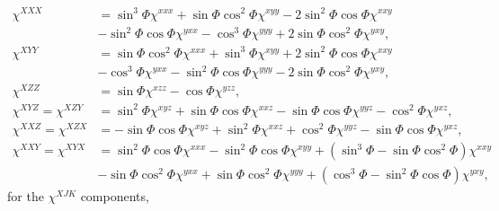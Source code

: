 \documentclass[aps,prb,10pt,letterpaper,notitlepage]{revtex4-1}
\begin{document}
\begin{equation}\label{eq:xcomps}
\begin{split}
\chi^{XXX} 
&=  \sin^{3}\Phi          \chi^{xxx}
 +  \sin\Phi \cos^{2}\Phi \chi^{xyy}
 - 2\sin^{2}\Phi \cos\Phi \chi^{xxy}\\
&-  \sin^{2}\Phi \cos\Phi \chi^{yxx}
 -  \cos^{3}\Phi          \chi^{yyy}
 + 2\sin\Phi \cos^{2}\Phi \chi^{yxy},\\[10pt]
\chi^{XYY} 
&=  \sin\Phi \cos^{2}\Phi \chi^{xxx}
 +  \sin^{3}\Phi          \chi^{xyy}
 + 2\sin^{2}\Phi \cos\Phi \chi^{xxy}\\
&-  \cos^{3}\Phi          \chi^{yxx}
 -  \sin^{2}\Phi \cos\Phi \chi^{yyy}
 - 2\sin\Phi \cos^{2}\Phi \chi^{yxy},\\[10pt]
\chi^{XZZ} 
&= \sin\Phi \chi^{xzz}
 - \cos\Phi \chi^{yzz},\\[10pt]
\chi^{XYZ} = \chi^{XZY}
&=
   \sin^{2}\Phi      \chi^{xyz}
 + \sin\Phi \cos\Phi \chi^{xxz}
 - \sin\Phi \cos\Phi \chi^{yyz}
 - \cos^{2}\Phi      \chi^{yxz},\\[10pt]
\chi^{XXZ} = \chi^{XZX}
&=
 - \sin\Phi \cos\Phi \chi^{xyz}
 + \sin^{2}\Phi      \chi^{xxz}
 + \cos^{2}\Phi      \chi^{yyz}
 - \sin\Phi \cos\Phi \chi^{yxz},\\[10pt]
\chi^{XXY} = \chi^{XYX} 
&= 
   \sin^{2}\Phi \cos\Phi \chi^{xxx}
 - \sin^{2}\Phi \cos\Phi \chi^{xyy}
 + (\sin^{3}\Phi - \sin\Phi \cos^{2}\Phi) \chi^{xxy}\\
&- \sin\Phi \cos^{2}\Phi \chi^{yxx}
 + \sin\Phi \cos^{2}\Phi \chi^{yyy}
 + (\cos^{3}\Phi - \sin^{2}\Phi \cos\Phi) \chi^{yxy},
\end{split}
\end{equation}
for the $\chi^{XJK}$ components,
\end{document}
